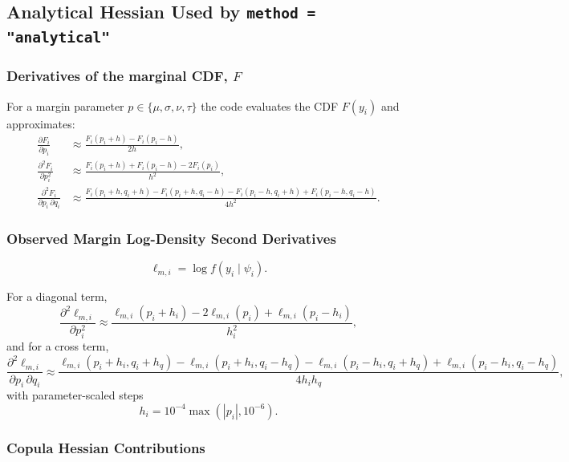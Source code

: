 \documentclass{article}
\begin{document}
\subsection{Analytical Hessian Used by \texttt{method = "analytical"}}
\subsubsection{Derivatives of the marginal CDF, $F$}\label{sec:vcov_ana_Fx}

For a margin parameter $p \in \{\mu,\sigma,\nu,\tau\}$ the code evaluates the CDF
$F(y_i)$ and approximates:
\begin{align*}
\frac{\partial F_i}{\partial p_i}
&\approx \frac{F_i(p_i+h)-F_i(p_i-h)}{2h}, \\
\frac{\partial^2 F_i}{\partial p_i^2}
&\approx \frac{F_i(p_i+h)+F_i(p_i-h)-2F_i(p_i)}{h^2}, \\
\frac{\partial^2 F_i}{\partial p_i\,\partial q_i}
&\approx \frac{F_i(p_i+h,q_i+h)-F_i(p_i+h,q_i-h)-F_i(p_i-h,q_i+h)+F_i(p_i-h,q_i-h)}{4h^2}.
\end{align*}

\subsubsection{Observed Margin Log-Density Second Derivatives}\label{sec:vcov_logfx}

\begin{equation*}
\ell_{m,i} = \log f(y_i \mid \psi_i).
\end{equation*}

For a diagonal term,
\begin{equation*}
\frac{\partial^2 \ell_{m,i}}{\partial p_i^2}
\approx
\frac{\ell_{m,i}(p_i+h_i)-2\ell_{m,i}(p_i)+\ell_{m,i}(p_i-h_i)}{h_i^2},
\end{equation*}
and for a cross term,
\begin{equation*}
\frac{\partial^2 \ell_{m,i}}{\partial p_i\,\partial q_i}
\approx
\frac{
\ell_{m,i}(p_i+h_i,q_i+h_q)
-\ell_{m,i}(p_i+h_i,q_i-h_q)
-\ell_{m,i}(p_i-h_i,q_i+h_q)
+\ell_{m,i}(p_i-h_i,q_i-h_q)
}{4h_i h_q},
\end{equation*}
with parameter-scaled steps
\begin{equation*}
h_i = 10^{-4}\max(|p_i|,10^{-6}).
\end{equation*}

\subsubsection{Copula Hessian Contributions}
\end{document}
